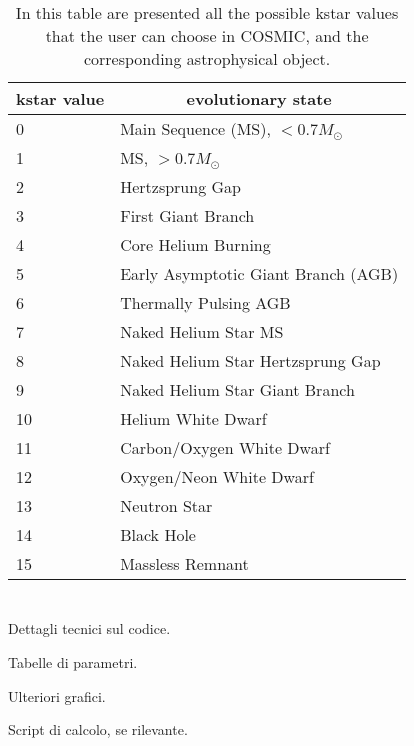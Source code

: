 \chapter{}
\begin{table}
    \caption{In this table are presented all the possible kstar values that the user can choose in COSMIC, and the corresponding astrophysical object.}\label{tab: kstar values}
    \begin{center}
        \begin{tabular}[]{l|l}
            \toprule
            \multicolumn{1}{c|}{\textbf{kstar value}} & 
            \multicolumn{1}{c}{\textbf{evolutionary state}} \\
            \midrule
            0 & Main Sequence (MS), $< 0.7 M_\odot$ \\
            1 & MS, $>0.7 M_\odot$ \\
            2 & Hertzsprung Gap \\
            3 & First Giant Branch \\
            4 & Core Helium Burning \\
            5 & Early Asymptotic Giant Branch (AGB) \\
            6 & Thermally Pulsing AGB \\
            7 & Naked Helium Star MS \\
            8 & Naked Helium Star Hertzsprung Gap \\
            9 & Naked Helium Star Giant Branch \\
            10 & Helium White Dwarf \\
            11 & Carbon/Oxygen White Dwarf \\
            12 & Oxygen/Neon White Dwarf \\
            13 & Neutron Star \\
            14 & Black Hole \\
            15 & Massless Remnant \\          
            \bottomrule
        \end{tabular}
    \end{center}
\end{table}


\chapter{}
Dettagli tecnici sul codice.

Tabelle di parametri.

Ulteriori grafici.

Script di calcolo, se rilevante.





